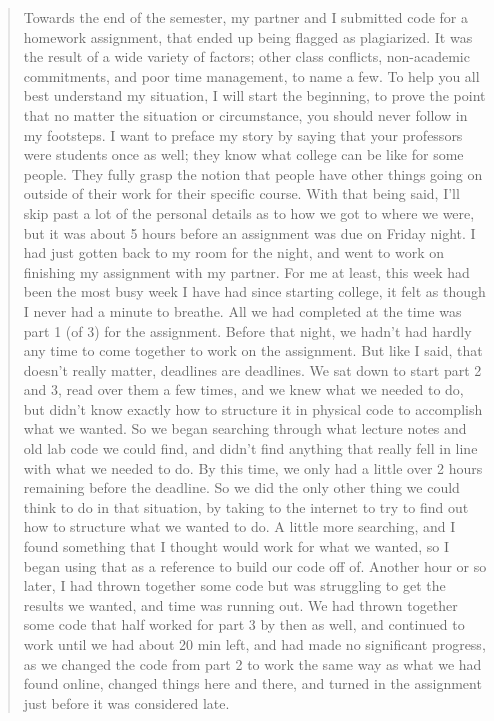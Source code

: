 \documentclass[12pt]{scrartcl}
\begin{document}
\begin{quote}
Towards the end of the semester, my partner and I submitted code for a homework assignment, that ended up being flagged as plagiarized. It was the result of a wide variety of factors; other class conflicts, non-academic commitments, and poor time management, to name a few. To help you all best understand my situation, I will start the beginning, to prove the point that no matter the situation or circumstance, you should never follow in my footsteps.
	I want to preface my story by saying that your professors were students once as well; they know what college can be like for some people. They fully grasp the notion that people have other things going on outside of their work for their specific course. With that being said, I'll skip past a lot of the personal details as to how we got to where we were, but it was about 5 hours before an assignment was due on Friday night. I had just gotten back to my room for the night, and went to work on finishing my assignment with my partner. For me at least, this week had been the most busy week I have had since starting college, it felt as though I never had a minute to breathe. All we had completed at the time was part 1 (of 3) for the assignment. Before that night, we hadn't had hardly any time to come together to work on the assignment. But like I said, that doesn't really matter, deadlines are deadlines. 
	We sat down to start part 2 and 3, read over them a few times, and we knew what we needed to do, but didn't know exactly how to structure it in physical code to accomplish what we wanted. So we began searching through what lecture notes and old lab code we could find, and didn't find anything that really fell in line with what we needed to do. By this time, we only had a little over 2 hours remaining before the deadline. So we did the only other thing we could think to do in that situation, by taking to the internet to try to find out how to structure what we wanted to do. A little more searching, and I found something that I thought would work for what we wanted, so I began using that as a reference to build our code off of. Another hour or so later, I had thrown together some code but was struggling to get the results we wanted, and time was running out. We had thrown together some code that half worked for part 3 by then as well, and continued to work until we had about 20 min left, and had made no significant progress, as we changed the code from part 2 to work the same way as what we had found online, changed things here and there, and turned in the assignment just before it was considered late. 

\end{quote}
\end{document}
